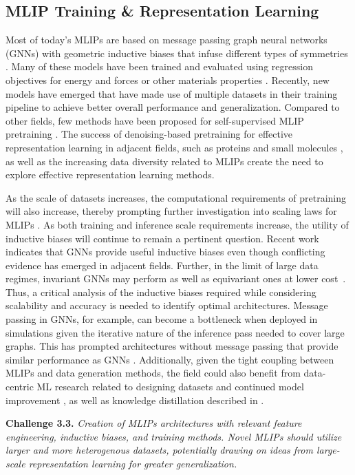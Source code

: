 \subsection{MLIP Training \& Representation Learning} \label{sec:mlip-dev}

Most of today's MLIPs are based on message passing graph neural networks (GNNs) with geometric inductive biases that infuse different types of symmetries \citep{duval2023hitchhiker}. Many of these models have been trained and evaluated using regression objectives for energy and forces or other materials properties \citep{riebesell2023matbench, chanussot2021open, choudhary2020joint, lee2023matsciml}. Recently, new models have emerged that have made use of multiple datasets in their training pipeline \citep{barroso2024open, neumann2024orb} to achieve better overall performance and generalization. Compared to other fields, few methods have been proposed for self-supervised MLIP pretraining \citep{DeNS}. The success of denoising-based pretraining for effective representation learning in adjacent fields, such as proteins \citep{abramson2024accurate, zhang2023protein} and small molecules \citep{zaidi2023pretraining}, as well as the increasing data diversity related to MLIPs create the need to explore effective representation learning methods. 

As the scale of datasets increases, the computational requirements of pretraining will also increase, thereby prompting further investigation into scaling laws for MLIPs \citep{frey2023neural}. As both training and inference scale requirements increase, the utility of inductive biases will continue to remain a pertinent question. Recent work indicates that GNNs provide useful inductive biases \citep{alampara2024mattext} even though conflicting evidence has emerged in adjacent fields. Further, in the limit of large data regimes, invariant GNNs may perform as well as equivariant ones at lower cost~\cite{qu2024importance,brehmer2024does, JMLR:v25:23-0680}. Thus, a critical analysis of the inductive biases required while considering scalability and accuracy is needed to identify optimal architectures. Message passing in GNNs, for example, can become a bottleneck when deployed in simulations given the iterative nature of the inference pass needed to cover large graphs. This has prompted architectures without message passing that provide similar performance as GNNs \citep{bochkarev2024graph}. Additionally, given the tight coupling between MLIPs and data generation methods, the field could also benefit from data-centric ML research related to designing datasets and continued model improvement \citep{oala2024dmlr}, as well as knowledge distillation described in .

\textbf{Challenge 3.3.} \textit{Creation of MLIPs architectures with relevant feature engineering, inductive biases, and training methods. Novel MLIPs should utilize larger and more heterogenous datasets, potentially drawing on ideas from large-scale representation learning for greater generalization.} 
